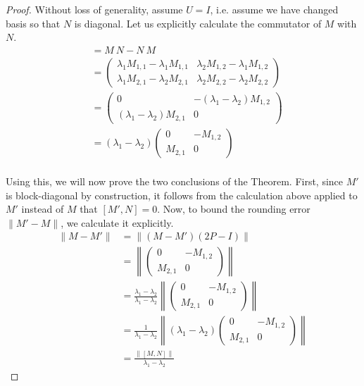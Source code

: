 \begin{proof}
Without loss of generality, assume $U = I$, i.e. assume we have changed basis so that $N$ is diagonal. Let us explicitly calculate the commutator of $M$ with $N$.
\begin{align*}
[M, N] &= M\ N - N\ M\\
&= \begin{pmatrix} \lambda_1 M_{1,1} - \lambda_1 M_{1,1} & \lambda_2 M_{1,2} - \lambda_1 M_{1,2} \\ \lambda_1 M_{2,1} - \lambda_2 M_{2,1} & \lambda_2 M_{2,2} - \lambda_2 M_{2,2}
\end{pmatrix}\\
&= \begin{pmatrix} 0 & - \left(\lambda_1 - \lambda_2\right) M_{1,2} \\ \left(\lambda_1 - \lambda_2\right) M_{2,1} & 0
\end{pmatrix}\\
&= \left(\lambda_1 - \lambda_2\right)\begin{pmatrix} 0 & - M_{1,2} \\  M_{2,1} & 0
\end{pmatrix}\\
\end{align*}

Using this, we will now prove the two conclusions of the Theorem. First, since $M'$ is block-diagonal by construction, it follows from the calculation above applied to $M'$ instead of $M$ that $[M', N] = 0$. Now, to bound the rounding error $\|M' - M\|$, we calculate it explicitly.
\begin{align*}
\|M - M' \| &= \| (M - M')(2P - I)\|\\
&= \left\|\begin{pmatrix}
            0 & -M_{1,2}\\
            M_{2,1} & 0
        \end{pmatrix} \right\|\\
&= \frac{\lambda_1 - \lambda_2}{\lambda_1 - \lambda_2} \left\|\begin{pmatrix}
            0 & -M_{1,2}\\
            M_{2,1} & 0
        \end{pmatrix} \right\|\\  
&= \frac{1}{\lambda_1 - \lambda_2}\left\|(\lambda_1 - \lambda_2)\begin{pmatrix}
            0 & -M_{1,2}\\
            M_{2,1} & 0
        \end{pmatrix} \right\|\\
&= \frac{\|[M, N]\|}{\lambda_1 - \lambda_2}
\end{align*}

\end{proof}


